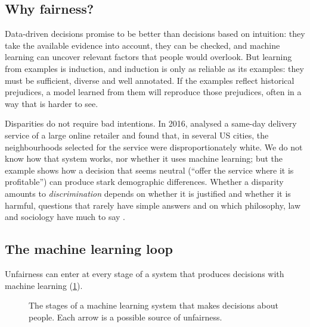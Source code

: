 \subsection{Why fairness?}

Data-driven decisions promise to be better than decisions based on intuition: they take the
available evidence into account, they can be checked, and machine learning can uncover
relevant factors that people would overlook. But learning from examples is induction, and
induction is only as reliable as its examples: they must be sufficient, diverse and well
annotated. If the examples reflect historical prejudices, a model learned from them will
reproduce those prejudices, often in a way that is harder to see.

Disparities do not require bad intentions. In 2016, \citet{ingold2016amazon} analysed a same-day delivery service
of a large online retailer and found that, in several US cities, the neighbourhoods selected for the
service were disproportionately white. We do not know how that system
works, nor whether it uses machine learning; but the example shows how a decision that seems
neutral (``offer the service where it is profitable'') can produce stark demographic
differences. Whether a disparity amounts to \emph{discrimination} depends on whether it is
justified and whether it is harmful, questions that rarely have simple answers and on which
philosophy, law and sociology have much to say \citep{barocas2023fairness}.

\subsection{The machine learning loop}

Unfairness can enter at every stage of a system that produces decisions with machine learning
(\cref{fig:mlloop}).

\begin{figure}[htbp]
\centering
{}
\caption{The stages of a machine learning system that makes decisions about people. Each
arrow is a possible source of unfairness.}
\label{fig:mlloop}
\end{figure}

